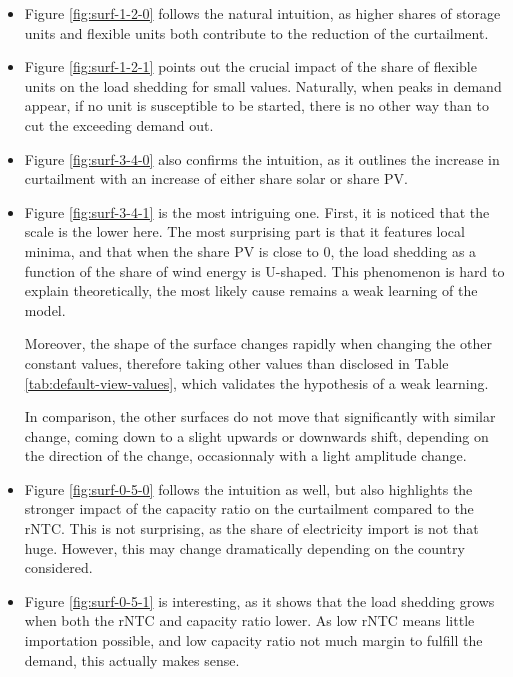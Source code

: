 \begin{itemize}
    \item Figure \ref{fig:surf-1-2-0} follows the natural intuition, as higher shares of storage units and flexible units both contribute to the reduction of the curtailment.
    \item Figure \ref{fig:surf-1-2-1} points out the crucial impact of the share of flexible units on the load shedding for small values. Naturally, when peaks in demand appear, if no unit is susceptible to be started, there is no other way than to cut the exceeding demand out.
    \item Figure \ref{fig:surf-3-4-0} also confirms the intuition, as it outlines the increase in curtailment with an increase of either share solar or share PV.
    \item Figure \ref{fig:surf-3-4-1} is the most intriguing one. First, it is noticed that the scale is the lower here. The most surprising part is that it features local minima, and that when the share PV is close to 0, the load shedding as a function of the share of wind energy is U-shaped. This phenomenon is hard to explain theoretically, the most likely cause remains a weak learning of the model.
    
    Moreover, the shape of the surface changes rapidly when changing the other constant values, therefore taking other values than disclosed in Table \ref{tab:default-view-values}, which validates the hypothesis of a weak learning.

    In comparison, the other surfaces do not move that significantly with similar change, coming down to a slight upwards or downwards shift, depending on the direction of the change, occasionnaly with a light amplitude change.
    \item Figure \ref{fig:surf-0-5-0} follows the intuition as well, but also highlights the stronger impact of the capacity ratio on the curtailment compared to the rNTC. This is not surprising, as the share of electricity import is not that huge. However, this may change dramatically depending on the country considered.
    \item Figure \ref{fig:surf-0-5-1} is interesting, as it shows that the load shedding grows when both the rNTC and capacity ratio lower. As low rNTC means little importation possible, and low capacity ratio not much margin to fulfill the demand, this actually makes sense.
\end{itemize}



